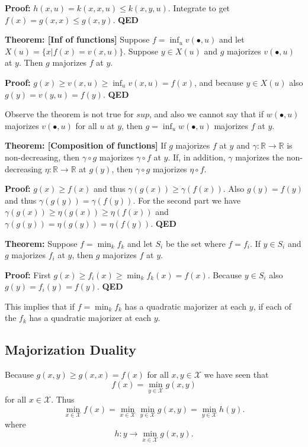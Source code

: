 \documentclass[
  12pt,
]{book}
\begin{document}
\textbf{Proof:} \(h(x,u)=k(x,x,u)\leq k(x,y,u)\). Integrate to get \(f(x)=g(x,x)\leq g(x,y)\).
\textbf{QED}

\textbf{Theorem: {[}Inf of functions{]}}
Suppose \(f=\inf_{u} v(\bullet,u)\) and let \(X(u)=\{x|f(x)=v(x,u)\}\).
Suppose \(y\in X(u)\) and \(g\) majorizes \(v(\bullet,u)\) at \(y\). Then \(g\) majorizes \(f\) at \(y\).

\textbf{Proof:} \(g(x)\geq v(x,u)\geq\inf_{u} v(x,u)=f(x)\), and because \(y\in X(u)\)
also \(g(y)=v(y,u)=f(y)\).
\textbf{QED}

Observe the theorem is not true for \(sup\), and also we cannot say that
if \(w(\bullet,u )\) majorizes \(v(\bullet,u)\) for all \(u\) at \(y\), then \(g=\inf_{u} w(\bullet,u)\)
majorizes \(f\) at \(y\).

\textbf{Theorem: {[}Composition of functions{]}}
If \(g\) majorizes \(f\) at \(y\) and \(\gamma:\mathbb{R}\rightarrow \mathbb{R}\) is non-decreasing, then \(\gamma\circ g\) majorizes \(\gamma\circ f\) at \(y\). If, in addition, \(\gamma\) majorizes
the non-decreasing \(\eta:\mathbb{R}\rightarrow \mathbb{R}\) at \(g(y)\), then \(\gamma\circ g\)
majorizes \(\eta\circ f\).

\textbf{Proof:} \(g(x)\geq f(x)\) and thus \(\gamma(g(x))\geq\gamma(f(x))\). Also \(g(y)=f(y)\) and thus \(\gamma(g(y))=\gamma(f(y))\). For the second part
we have \(\gamma(g(x))\geq\eta(g(x))\geq\eta(f(x))\) and \(\gamma(g(y))=\eta(g(y))=\eta(f(y))\).
\textbf{QED}

\textbf{Theorem: }
Suppose \(f=\min_{k} f_{k}\) and let \(S_{i}\) be the set where \(f=f_{i}\).
If \(y\in S_{i}\) and \(g\) majorizes \(f_{i}\) at \(y\), then \(g\) majorizes \(f\) at \(y\).

\textbf{Proof:}
First \(g(x)\geq f_{i}(x)\geq\min_{k} f_{k}(x)=f(x)\).
Because \(y\in S_{i}\) also \(g(y)=f_{i}(y)=f(y)\).
\textbf{QED}

This implies that if \(f=\min_{k} f_{k}\) has a quadratic majorizer at each \(y\), if each of the \(f_{k}\) has a quadratic majorizer at each \(y\).

\hypertarget{majorization-duality}{%
\subsection{Majorization Duality}\label{majorization-duality}}

Because \(g(x,y)\geq g(x,x)=f(x)\) for all \(x,y\in\mathcal{X}\) we have seen that
\[
f(x)=\min_{y\in\mathcal{X}}g(x,y)
\]
for all \(x\in\mathcal{X}\).
Thus
\[
\min_{x\in\mathcal{X}}f(x)=\min_{x\in\mathcal{X}}\min_{y\in\mathcal{X}}g(x,y)=\min_{y\in\mathcal{X}}h(y).
\]
where
\[
h:y\rightarrow \min_{x\in\mathcal{X}}g(x,y).
\]
\end{document}
